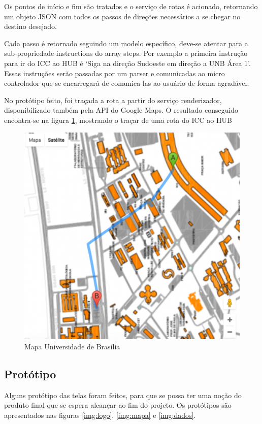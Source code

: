 Os pontos de início e fim são tratados e o serviço de rotas é acionado, retornando um objeto JSON com todos os passos de direções necessários a se chegar no destino desejado.

Cada passo é retornado seguindo um modelo específico, deve-se atentar para a sub-propriedade instructions do array steps. Por exemplo a primeira instrução para ir do ICC ao HUB é ‘Siga na direção Sudoeste em direção a UNB Área 1’. Essas instruções serão passadas por um parser e comunicadas ao micro controlador que se encarregará de comunica-las ao usuário de forma agradável.

No protótipo feito, foi traçada a rota a partir do serviço renderizador, disponibilizado também pela API do Google Maps. O resultado conseguido encontra-se na figura \ref{img:mapa_unb2}, mostrando o traçar de uma rota do ICC ao HUB

\graphicspath{{figuras/}}
\begin{figure}[h!]
\centering
\includegraphics[scale=0.80]{mapa_unb_2}
\caption{Mapa Universidade de Brasília}
\label{img:mapa_unb2}
\end{figure}

	\subsection{Protótipo}
	Alguns protótipo das telas foram feitos, para que se possa ter uma noção do produto final que se espera alcançar ao fim do projeto. Os protótipos são apresentados nas figuras \ref{img:logo}, \ref{img:mapa} e \ref{img:dados}.
	

